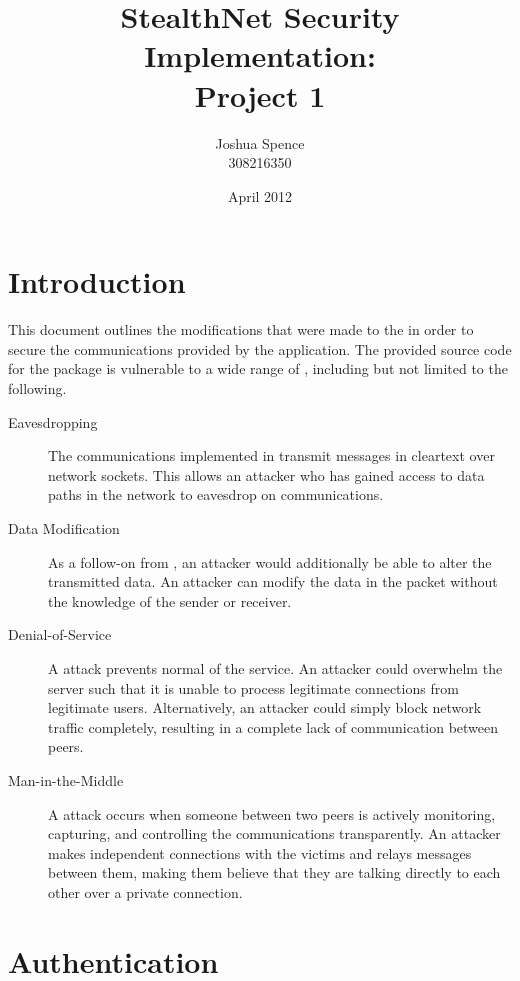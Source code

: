 \documentclass[a4paper,11pt]{article}
\title{StealthNet Security Implementation: \\ Project 1}
\author{Joshua Spence \\ 308216350}
\date{April 2012}
\begin{document}
\maketitle

\section{Introduction}
This document outlines the modifications that were made to the \packageName{} in
order to secure the communications provided by the application. The provided
source code for the \packageName{} package is vulnerable to a wide range of 
, including but not limited to the following.

\begin{description}

\item[Eavesdropping] The communications implemented in \packageName{} transmit
messages in cleartext over network sockets. This allows an attacker who has 
gained access to data paths in the network to eavesdrop on \packageName{} 
communications.

\item[Data Modification] As a follow-on from , an 
attacker would additionally be able to alter the transmitted data. An attacker
can modify the data in the packet without the knowledge of the sender or 
receiver.

\item[Denial-of-Service] A  attack prevents normal
of the \serviceName{} service. An attacker could overwhelm the \serviceName{} 
server such that it is unable to process legitimate connections from legitimate 
users. Alternatively, an attacker could simply block network traffic completely,
resulting in a complete lack of communication between \serviceName{} peers.

\item[Man-in-the-Middle] A  attack occurs when 
someone between two \serviceName{} peers is actively monitoring, capturing, and 
controlling the communications transparently. An attacker makes independent 
connections with the victims and relays messages between them, making them 
believe that they are talking directly to each other over a private connection.

\end{description}

\section{Authentication}
\end{document}
